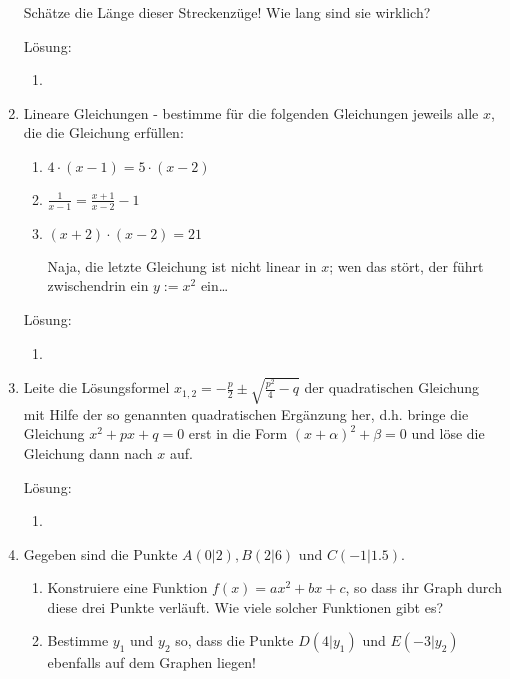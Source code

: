 \documentclass[../main.tex]{subfiles}
\begin{document}
\begin{enumerate}
	      Schätze die Länge dieser Streckenzüge! Wie lang sind sie wirklich?

	      Lösung:
	      \begin{enumerate}
		      \item
	      \end{enumerate}
	\item Lineare Gleichungen - bestimme für die folgenden Gleichungen jeweils alle
	      \(
	      x
	      \), die die Gleichung erfüllen:
	      \begin{enumerate}
		      \item \(
		            4 \cdot ( x - 1)
		            = 5 \cdot (x - 2)
		            \)
		      \item \(
		            \frac{1}{x-1}
		            = \frac{x+1}{x-2} -1
		            \)
		      \item \(
		            (x + 2) \cdot (x- 2) = 21
		            \)

		            Naja, die letzte Gleichung ist nicht linear in \(
		            x
		            \); wen das stört, der führt
		            zwischendrin ein \(
		            y := x^2
		            \) ein\ldots
	      \end{enumerate}

	      Lösung:
	      \begin{enumerate}
		      \item
	      \end{enumerate}
	\item Leite die Lösungsformel \(
	      x_{1,2} = - \frac{p}{2} \pm \sqrt{ \frac{p^2}{4} - q }
	      \) der quadratischen Gleichung mit Hilfe der so genannten quadratischen Ergänzung her,
	      d.h. bringe die Gleichung \(
	      x^2 + px + q = 0
	      \) erst in die Form \(
	      (x + \alpha)^2 + \beta = 0
	      \) und löse die Gleichung dann nach \(
	      x
	      \) auf.

	      Lösung:
	      \begin{enumerate}
		      \item
	      \end{enumerate}
	\item Gegeben sind die Punkte \(
	      A(0|2), B(2|6)
	      \) und \(
	      C(-1|1.5)
	      \).
	      \begin{enumerate}
		      \item Konstruiere eine Funktion \(
		            f(x) = ax^2 + bx + c
		            \), so dass ihr Graph durch
		            diese drei Punkte verläuft.
		            Wie viele solcher Funktionen gibt es?
		      \item Bestimme \(
		            y_1
		            \) und \(
		            y_2
		            \) so, dass die Punkte
		            \(
		            D(4|y_1)
		            \) und \(
		            E(-3|y_2)
		            \) ebenfalls auf dem Graphen liegen!
	      \end{enumerate}


\end{enumerate}
\end{document}
